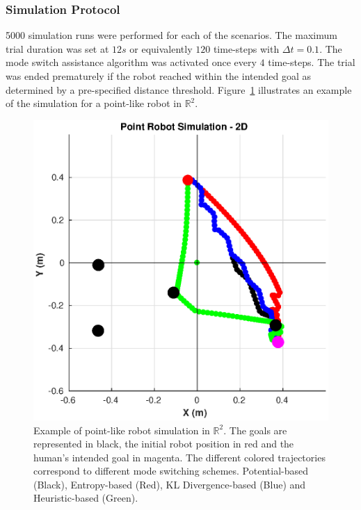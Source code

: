 \documentclass[conference]{IEEEtran}
\begin{document}
\subsubsection{Simulation Protocol}
5000 simulation runs were performed for each of the scenarios. 
The maximum trial duration was set at $12s$ or equivalently $120$ time-steps with $\Delta t = 0.1$. The mode switch assistance algorithm was activated once every $4$ time-steps. The trial was ended prematurely if the robot reached within the intended goal as determined by a pre-specified distance threshold. Figure~\ref{fig:ws_sim} illustrates an example of the simulation for a point-like robot in $\mathbb{R}^2$. 
 \begin{figure}[h!]
	\centering
	\includegraphics[width= 0.8\hsize, height=0.3\vsize]{./figures/WS_SIM.eps}
	\vspace{-0.35cm}
	\caption{Example of point-like robot simulation in $\mathbb{R}^2$. The goals are represented in black, the initial robot position in red and the human's intended goal in magenta. The different colored trajectories correspond to different mode switching schemes. Potential-based (Black), Entropy-based (Red), KL Divergence-based (Blue) and Heuristic-based (Green).} 
	\label{fig:ws_sim}
\end{figure}
\end{document}
